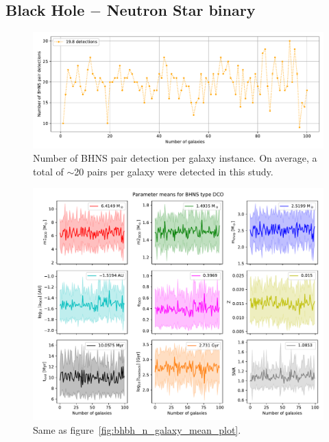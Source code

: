\subsection{Black Hole $-$ Neutron Star binary}
\begin{figure}[h]
	\centering
    \includegraphics[width=\columnwidth]{analysis_data/004__images_for_latex/BHNS_n_detections}
	\caption{Number of BHNS pair detection per galaxy instance. On average, a total of $\sim$20 pairs per galaxy were detected in this study.}
	\label{fig:bhnsndetections}
\end{figure}	

\begin{figure}[h]
	\centering
    \includegraphics[width=\columnwidth]{analysis_data/004__images_for_latex/BHNS_n_galaxy_mean_plot}
	\caption{Same as figure~\ref{fig:bhbh_n_galaxy_mean_plot}.}
	\label{fig:bhns_n_galaxy_mean_plot}
\end{figure}%

